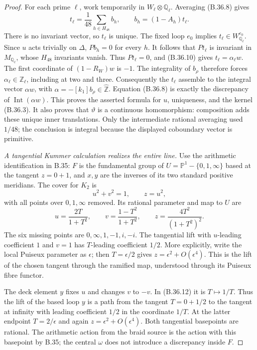 \begin{proof}
For each prime $\ell$, work temporarily in
$W_\ell\otimes\mathbb Q_\ell$.  Averaging (B.36.8) gives
\[
 t_\ell=\frac1{48}\sum_{h\in H_{48}}b_h,
 \qquad b_h=(1-A_h)t_\ell.                              \tag{B.36.11}
\]
There is no invariant vector, so $t_\ell$ is unique.
The fixed loop $e_0$ implies $t_\ell\in W^{e_0}_{\mathbb Q_\ell}$.
Since $u$ acts trivially on $\Delta$, $Pb_h=0$ for every $h$.
It follows that $Pt_\ell$ is invariant in $M_{\mathbb Q_\ell}$,
whose $H_{48}$ invariants vanish.  Thus $Pt_\ell=0$, and
(B.36.10) gives $t_\ell=\alpha_\ell w$.
The first coordinate of $(1-R_W)w$ is $-1$.  The integrality
of $b_\rho$ therefore forces $\alpha_\ell\in\mathbb Z_\ell$,
including at two and three.  Consequently the $t_\ell$ assemble
to the integral vector $\alpha w$, with
$\alpha=-[k_1]b_\rho\in\widehat{\mathbb Z}$.
Equation (B.36.8) is exactly the discrepancy of
$\operatorname{Int}(\alpha w)$.  This proves the asserted
formula for $u$, uniqueness, and the kernel (B.36.3).
It also proves that $\vartheta$ is a continuous homomorphism:
composition adds these unique inner translations.
Only the intermediate rational averaging used $1/48$;
the conclusion is integral because the displayed coboundary
vector is primitive.

\emph{A tangential Kummer calculation realizes the entire line.}
Use the arithmetic identification in B.35: $F$ is the
fundamental group of $U=\mathbb P^1-\{0,1,\infty\}$ based
at the tangent $z=0+1$, and $x,y$ are the inverses of its
two standard positive meridians.  The cover for $K_2$ is
\[
 u^2+v^2=1,\qquad z=u^2,
\]
with all points over $0,1,\infty$ removed.  Its rational
parameter and map to $U$ are
\[
 u=\frac{2T}{1+T^2},\qquad
 v=\frac{1-T^2}{1+T^2},\qquad
 z=\frac{4T^2}{(1+T^2)^2}.                             \tag{B.36.12}
\]
The six missing points are $0,\infty,1,-1,i,-i$.
The tangential lift with $u$-leading coefficient $1$ and
$v=1$ has $T$-leading coefficient $1/2$.  More explicitly,
write the local Puiseux parameter as $\epsilon$; then
$T=\epsilon/2$ gives $z=\epsilon^2+O(\epsilon^4)$.
This is the lift of the chosen tangent through the ramified
map, understood through its Puiseux fibre functor.

The deck element $y$ fixes $u$ and changes $v$ to $-v$.
In (B.36.12) it is $T\mapsto1/T$.
Thus the lift of the based loop $y$ is a path from the
tangent $T=0+1/2$ to the tangent at infinity with leading
coefficient $1/2$ in the coordinate $1/T$.
At the latter endpoint $T=2/\epsilon$ and again
$z=\epsilon^2+O(\epsilon^4)$.  Both tangential basepoints
are rational.  The arithmetic action from the braid source
is the action with this basepoint by B.35; the central
$\omega$ does not introduce a discrepancy inside $F$.


\end{proof}
